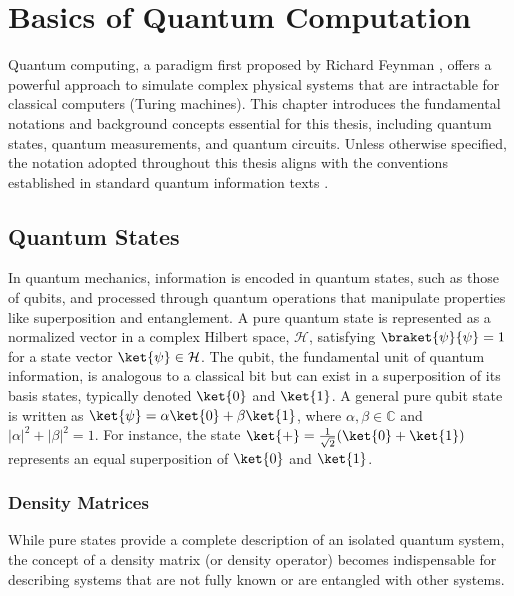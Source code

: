 
\chapter{Basics of Quantum Computation}
\label{chap:basics_qc}

Quantum computing, a paradigm first proposed by Richard Feynman \cite{feynman},
offers a powerful approach to simulate complex physical systems that are
intractable for classical computers (Turing machines).
This chapter introduces the fundamental notations and background concepts
essential for this thesis, including quantum states, quantum measurements,
and quantum circuits.
Unless otherwise specified, the notation adopted throughout this thesis aligns
with the conventions established in standard quantum information texts \cite{qcqi, 10.5555/3240076}.

\section{Quantum States}

In quantum mechanics, information is encoded in quantum states, such as those
of qubits, and processed through quantum operations that manipulate properties
like superposition and entanglement.
A pure quantum state is represented as a normalized vector in a complex
Hilbert space, $\mathcal{H}$, satisfying $\braket{\psi}{\psi} = 1$ for a state
vector $\ket{\psi} \in \mathcal{H}$.
The qubit, the fundamental unit of quantum information, is analogous to a
classical bit but can exist in a superposition of its basis states, typically
denoted $\ket{0}$ and $\ket{1}$.
A general pure qubit state is written as $\ket{\psi} = \alpha\ket{0} + \beta\ket{1}$,
where $\alpha, \beta \in \mathbb{C}$ and $|\alpha|^2 + |\beta|^2 = 1$.
For instance, the state $\ket{+} = \frac{1}{\sqrt{2}}(\ket{0} + \ket{1})$
represents an equal superposition of $\ket{0}$ and $\ket{1}$.

\subsection{Density Matrices}

While pure states provide a complete description of an isolated quantum system,
the concept of a density matrix (or density operator) becomes indispensable
for describing systems that are not fully known or are entangled with other systems.

